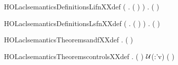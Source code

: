 \begin{SaveVerbatim}{HOLaclsemanticsDefinitionsLifnXXdef}
\HOLTokenTurnstile{} (\HOLSymConst{\HOLTokenForall{}} .   ( ) \HOLSymConst{=} ) \HOLSymConst{\HOLTokenConj{}}
   \HOLSymConst{\HOLTokenForall{}} .   ( ) \HOLSymConst{=}   
\end{SaveVerbatim}
\newcommand{\HOLaclsemanticsDefinitionsLifnXXdef}{\UseVerbatim{HOLaclsemanticsDefinitionsLifnXXdef}}
\begin{SaveVerbatim}{HOLaclsemanticsDefinitionsLsfnXXdef}
\HOLTokenTurnstile{} (\HOLSymConst{\HOLTokenForall{}} .   ( ) \HOLSymConst{=} ) \HOLSymConst{\HOLTokenConj{}}
   \HOLSymConst{\HOLTokenForall{}} .   ( ) \HOLSymConst{=}   
\end{SaveVerbatim}
\newcommand{\HOLaclsemanticsDefinitionsLsfnXXdef}{\UseVerbatim{HOLaclsemanticsDefinitionsLsfnXXdef}}
\newcommand{\HOLaclsemanticsDefinitions}{
\HOLDfnTag{aclsemantics}{Efn_def}\HOLaclsemanticsDefinitionsEfnXXdef
\HOLDfnTag{aclsemantics}{Jext_def}\HOLaclsemanticsDefinitionsJextXXdef
\HOLDfnTag{aclsemantics}{Lifn_def}\HOLaclsemanticsDefinitionsLifnXXdef
\HOLDfnTag{aclsemantics}{Lsfn_def}\HOLaclsemanticsDefinitionsLsfnXXdef
}
\begin{SaveVerbatim}{HOLaclsemanticsTheoremsandfXXdef}
\HOLTokenTurnstile{} \HOLSymConst{\HOLTokenForall{}}    .
         (  ) \HOLSymConst{=}      \HOLConst{\HOLTokenInter{}}     
\end{SaveVerbatim}
\newcommand{\HOLaclsemanticsTheoremsandfXXdef}{\UseVerbatim{HOLaclsemanticsTheoremsandfXXdef}}
\begin{SaveVerbatim}{HOLaclsemanticsTheoremscontrolsXXdef}
\HOLTokenTurnstile{} \HOLSymConst{\HOLTokenForall{}}    .
         (  ) \HOLSymConst{=}
     \ensuremath{\cal{U}}(:'v)  \HOLTokenLeftbrace{} \HOLTokenBar{}  ( )   \HOLConst{\HOLTokenSubset{}}     \HOLTokenRightbrace{} \HOLConst{\HOLTokenUnion{}}
         
\end{SaveVerbatim}
